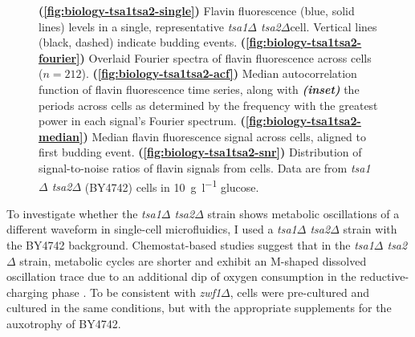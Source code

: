 \begin{figure}
  \caption[
    Flavin fluorescence levels in a single, representative \textit{tsa1$\Delta$ tsa2$\Delta$}cell.
    Overlaid Fourier spectra of flavin fluorescence across cells.
    Median autocorrelation function of flavin fluorescence time series, along with the periods across cells.
    Median flavin fluorescence signal across cells, aligned to first budding event.
    Distribution of signal-to-noise ratios of flavin signals from cells.
    Data are from \textit{tsa1$\Delta$ tsa2$\Delta$} (BY4742) cells in \SI{10}{\gram~\litre^{-1}} glucose.
  ]{
    \textbf{(\ref{fig:biology-tsa1tsa2-single})}
    Flavin fluorescence (blue, solid lines) levels in a single, representative \textit{tsa1$\Delta$ tsa2$\Delta$}cell.
    Vertical lines (black, dashed) indicate budding events.
    \textbf{(\ref{fig:biology-tsa1tsa2-fourier})}
    Overlaid Fourier spectra of flavin fluorescence across cells ($n=212$).
    \textbf{(\ref{fig:biology-tsa1tsa2-acf})}
    Median autocorrelation function of flavin fluorescence time series, along with \textit{\textbf{(inset)}} the periods across cells as determined by the frequency with the greatest power in each signal's Fourier spectrum.
    \textbf{(\ref{fig:biology-tsa1tsa2-median})}
    Median flavin fluorescence signal across cells, aligned to first budding event.
    \textbf{(\ref{fig:biology-tsa1tsa2-snr})}
    Distribution of signal-to-noise ratios of flavin signals from cells.
    Data are from \textit{tsa1$\Delta$ tsa2$\Delta$} (BY4742) cells in \SI{10}{\gram~\litre^{-1}} glucose.
  }
  \label{fig:biology-tsa1tsa2}
\end{figure}


To investigate whether the \textit{tsa1$\Delta$ tsa2$\Delta$} strain shows metabolic oscillations of a different waveform in single-cell microfluidics, I used a \textit{tsa1$\Delta$ tsa2$\Delta$} strain with the BY4742 background.
Chemostat-based studies suggest that in the \textit{tsa1$\Delta$ tsa2$\Delta$} strain, metabolic cycles are shorter and exhibit an M-shaped dissolved oscillation trace due to an additional dip of oxygen consumption in the reductive-charging phase \parencite{caustonMetabolicCyclesYeast2015}.
To be consistent with \textit{zwf1$\Delta$}, cells were pre-cultured and cultured in the same conditions, but with the appropriate supplements for the auxotrophy of BY4742.
%

